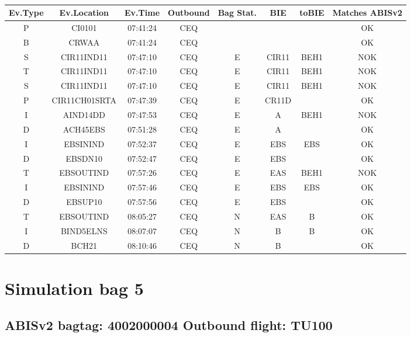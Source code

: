 \documentclass{report}
\begin{document}
\paragraph{}
\begin{longtable}{cccccccc}    \toprule
\rowcolor{white!50}
\textbf{Ev.Type} & \textbf{Ev.Location} & \textbf{Ev.Time} & \textbf{Outbound} & \textbf{Bag Stat.} & \textbf{BIE} & \textbf{toBIE} & \textbf{Matches ABISv2} \\\midrule
P & CI0101 & 07:41:24  & CEQ &  &  &  & OK\\
B & CRWAA & 07:41:24  & CEQ &  &  &  & OK\\
S & CIR11IND11 & 07:47:10  & CEQ & E & CIR11 & BEH1 & NOK\\
T & CIR11IND11 & 07:47:10  & CEQ & E & CIR11 & BEH1 & NOK\\
S & CIR11IND11 & 07:47:10  & CEQ & E & CIR11 & BEH1 & NOK\\
P & CIR11CH01SRTA & 07:47:39  & CEQ & E & CR11D &  & OK\\
I & AIND14DD & 07:47:53  & CEQ & E & A & BEH1 & NOK\\
D & ACH45EBS & 07:51:28  & CEQ & E & A &  & OK\\
I & EBSININD & 07:52:37  & CEQ & E & EBS & EBS & OK\\
D & EBSDN10 & 07:52:47  & CEQ & E & EBS &  & OK\\
T & EBSOUTIND & 07:57:26  & CEQ & E & EAS & BEH1 & NOK\\
I & EBSININD & 07:57:46  & CEQ & E & EBS & EBS & OK\\
D & EBSUP10 & 07:57:56  & CEQ & E & EBS &  & OK\\
T & EBSOUTIND & 08:05:27  & CEQ & N & EAS & B & OK\\
I & BIND5ELNS & 08:07:07  & CEQ & N & B & B & OK\\
D & BCH21 & 08:10:46  & CEQ & N & B &  & OK\\
\bottomrule
\end{longtable}
\pagebreak
\section*{Simulation bag 5}
\subsection*{ABISv2 bagtag: 4002000004 Outbound flight: TU100}
\end{document}
